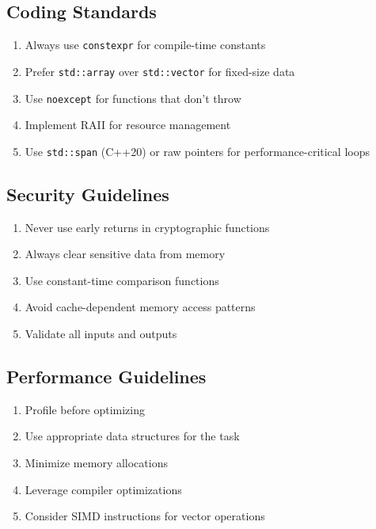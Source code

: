 \documentclass[11pt,a4paper]{article}
\begin{document}
\subsection{Coding Standards}

\begin{enumerate}
    \item Always use \texttt{constexpr} for compile-time constants
    \item Prefer \texttt{std::array} over \texttt{std::vector} for fixed-size data
    \item Use \texttt{noexcept} for functions that don't throw
    \item Implement RAII for resource management
    \item Use \texttt{std::span} (C++20) or raw pointers for performance-critical loops
\end{enumerate}

\subsection{Security Guidelines}

\begin{enumerate}
    \item Never use early returns in cryptographic functions
    \item Always clear sensitive data from memory
    \item Use constant-time comparison functions
    \item Avoid cache-dependent memory access patterns
    \item Validate all inputs and outputs
\end{enumerate}

\subsection{Performance Guidelines}

\begin{enumerate}
    \item Profile before optimizing
    \item Use appropriate data structures for the task
    \item Minimize memory allocations
    \item Leverage compiler optimizations
    \item Consider SIMD instructions for vector operations
\end{enumerate}
\end{document}
